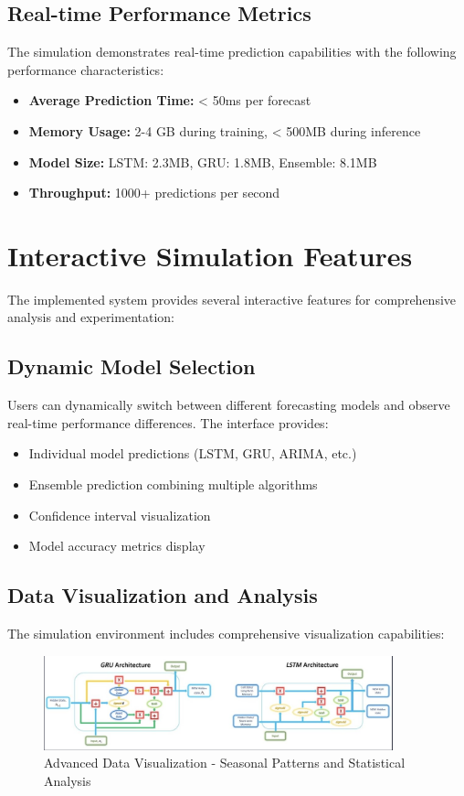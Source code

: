 \documentclass[12pt,a4paper]{report}
\begin{document}
\subsection{Real-time Performance Metrics}
The simulation demonstrates real-time prediction capabilities with the following performance characteristics:
\begin{itemize}
\item \textbf{Average Prediction Time:} < 50ms per forecast
\item \textbf{Memory Usage:} 2-4 GB during training, < 500MB during inference
\item \textbf{Model Size:} LSTM: 2.3MB, GRU: 1.8MB, Ensemble: 8.1MB
\item \textbf{Throughput:} 1000+ predictions per second
\end{itemize}

\section{Interactive Simulation Features}
The implemented system provides several interactive features for comprehensive analysis and experimentation:

\subsection{Dynamic Model Selection}
Users can dynamically switch between different forecasting models and observe real-time performance differences. The interface provides:
\begin{itemize}
\item Individual model predictions (LSTM, GRU, ARIMA, etc.)
\item Ensemble prediction combining multiple algorithms
\item Confidence interval visualization
\item Model accuracy metrics display
\end{itemize}

\subsection{Data Visualization and Analysis}
The simulation environment includes comprehensive visualization capabilities:

\begin{figure}[H]
    \centering
    \includegraphics[width=0.9\textwidth]{5.png}
    \caption{Advanced Data Visualization - Seasonal Patterns and Statistical Analysis}
    \label{fig:data_visualization}
\end{figure}
\end{document}
